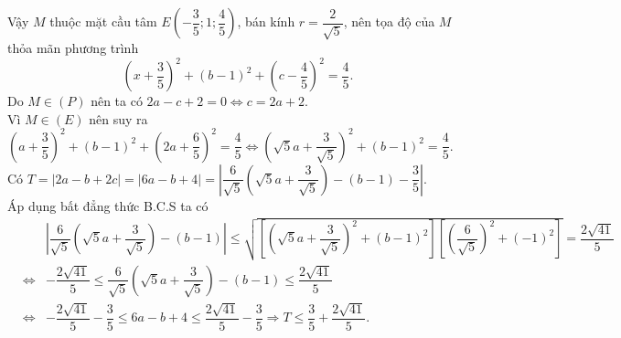 \begin{ex}
{Vậy $M$ thuộc mặt cầu tâm $E\left(-\dfrac{3}{5};1;\dfrac{4}{5}\right)$, bán kính $r=\dfrac{2}{\sqrt{5}}$, nên tọa độ của $M$ thỏa mãn phương trình 
$$\left(x+\dfrac{3}{5}\right)^2+(b-1)^2+\left(c-\dfrac{4}{5}\right)^2=\dfrac{4}{5}.$$
Do $M\in (P)$ nên ta có $2a-c+2=0\Leftrightarrow c=2a+2.$\\
Vì $M\in (E)$ nên suy ra $\left(a+\dfrac{3}{5}\right)^2+(b-1)^2+\left(2a+\dfrac{6}{5}\right)^2=\dfrac{4}{5}\Leftrightarrow \left(\sqrt{5}a+\dfrac{3}{\sqrt{5}}\right)^2+(b-1)^2=\dfrac{4}{5}$.\\
Có $T=|2a-b+2c|=|6a-b+4|=\left|\dfrac{6}{\sqrt{5}}\left(\sqrt{5}a+\dfrac{3}{\sqrt{5}}\right)-(b-1)-\dfrac{3}{5}\right|$. \\
Áp dụng bất đẳng thức B.C.S ta có 
\begin{eqnarray*}
	& &\left|\dfrac{6}{\sqrt{5}}\left(\sqrt{5}a+\dfrac{3}{\sqrt{5}}\right)-(b-1)\right|\le \sqrt{\left[\left(\sqrt{5}a+\dfrac{3}{\sqrt{5}}\right)^2+(b-1)^2\right]\left[\left(\dfrac{6}{\sqrt{5}}\right)^2+(-1)^2\right]}=\dfrac{2\sqrt{41}}{5}\\
	&\Leftrightarrow& -\dfrac{2\sqrt{41}}{5}\le \dfrac{6}{\sqrt{5}}\left(\sqrt{5}a+\dfrac{3}{\sqrt{5}}\right)-(b-1)\le \dfrac{2\sqrt{41}}{5} \\
	&\Leftrightarrow &-\dfrac{2\sqrt{41}}{5}-\dfrac{3}{5}\le 6a-b+4\le \dfrac{2\sqrt{41}}{5}-\dfrac{3}{5}\Rightarrow T\le \dfrac{3}{5}+\dfrac{2\sqrt{41}}{5}.
\end{eqnarray*}
}
\end{ex}
